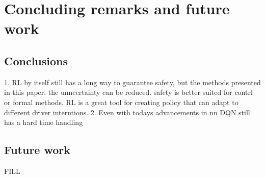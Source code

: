 \chapter{Concluding remarks and future work}
\section{Conclusions}\label{sec:conclusion}

1. RL by itself still has a long way to guarantee safety, but the methods presented in this paper. the unncertainty can be reduced. safety is better suited for contrl or formal methods. RL is a great tool for creating policy that can adapt to different driver interntions. 
2. Even with todays advancements in \gls{nn} DQN still has a hard time handling 
\section{Future work}
FILL